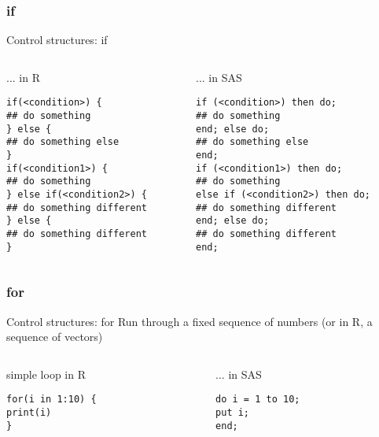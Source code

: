 \documentclass[xcolor=table,compress]{beamer}
\begin{document}
\subsubsection{if}
\begin{frame}[fragile]{Control structures: if}
\begin{columns}
\begin{column}[t]{.48\textwidth}
\pause
\begin{block}{... in R}
\lstset{language=R}
\begin{lstlisting}
if(<condition>) {
## do something
} else {
## do something else
}
if(<condition1>) {
## do something
} else if(<condition2>) {
## do something different
} else {
## do something different
}
\end{lstlisting}
\end{block}
\end{column}
\hfill\pause
\begin{column}[t]{.48\textwidth}
\begin{block}{... in SAS}
\lstset{language=SAS}
\begin{lstlisting}
if (<condition>) then do;
## do something
end; else do;
## do something else
end;
if (<condition1>) then do;
## do something
else if (<condition2>) then do;
## do something different
end; else do;
## do something different
end;
\end{lstlisting}
\end{block}
\end{column}
\end{columns}
\end{frame}




\subsubsection{for}

\begin{frame}[fragile]{Control structures: for}
Run through a fixed sequence of numbers (or in R, a sequence of vectors)
\begin{columns}
\begin{column}[t]{.48\textwidth}
\pause
\begin{block}{simple loop in R}
\lstset{language=R}
\begin{lstlisting}
for(i in 1:10) {
print(i)
}
\end{lstlisting}
\end{block}
\end{column}
\hfill\pause
\begin{column}[t]{.48\textwidth}
\begin{block}{... in SAS}
\lstset{language=SAS}
\begin{lstlisting}
do i = 1 to 10;
put i;
end;
\end{lstlisting}
\end{block}
\end{column}

\end{columns}
\end{frame}
\end{document}
